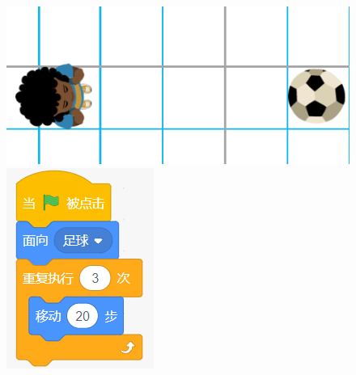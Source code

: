 \documentclass[10pt, a4paper]{article}
\begin{document}
\begin{enumerate}
        \begin{figure}[htbp]
            \centering
            \begin{minipage}[t]{.4\textwidth}
                \centering
                \begin{minipage}[t]{.65\textwidth}
                    \centering
                    \includegraphics[width=\textwidth]{figure/29-1.png}
                \end{minipage}
                \begin{minipage}[t]{.25\textwidth}
                    \centering
                    \includegraphics[width=\textwidth]{figure/29-2.png}

\end{minipage}
\end{minipage}
\end{figure}
\end{enumerate}
\end{document}
